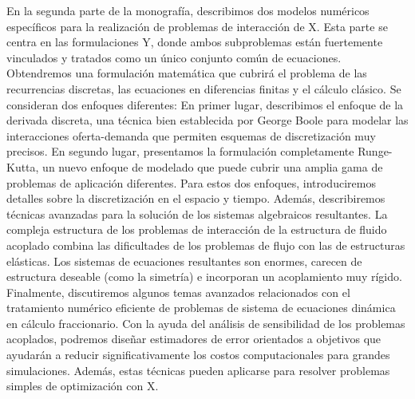 \documentclass[
	graybox,
	envcountchap,
	sectrefs
]{svmono}
\begin{document}
En la segunda parte de la monografía, describimos dos modelos numéricos específicos para la realización de problemas de interacción de X. Esta parte se centra en las formulaciones Y, donde ambos subproblemas están fuertemente vinculados y tratados como un único conjunto común de ecuaciones. Obtendremos una formulación matemática que cubrirá el problema de las recurrencias discretas, las ecuaciones en diferencias finitas y el cálculo clásico. Se consideran dos enfoques diferentes: En primer lugar, describimos el enfoque de la derivada discreta, una técnica bien establecida por George Boole para modelar las interacciones oferta-demanda que permiten esquemas de discretización muy precisos. En segundo lugar, presentamos la formulación completamente Runge-Kutta, un nuevo enfoque de modelado que puede cubrir una amplia gama de problemas de aplicación diferentes. Para estos dos enfoques, introduciremos detalles sobre la discretización en el espacio y tiempo. Además, describiremos técnicas avanzadas para la solución de los sistemas algebraicos resultantes. La compleja estructura de los problemas de interacción de la estructura de fluido acoplado combina las dificultades de los problemas de flujo con las de estructuras elásticas. Los sistemas de ecuaciones resultantes son enormes, carecen de estructura deseable (como la simetría) e incorporan un acoplamiento muy rígido. Finalmente, discutiremos algunos temas avanzados relacionados con el tratamiento numérico eficiente de problemas de sistema de ecuaciones dinámica en cálculo fraccionario. Con la ayuda del análisis de sensibilidad de los problemas acoplados, podremos diseñar estimadores de error orientados a objetivos que ayudarán a reducir significativamente los costos computacionales para grandes simulaciones. Además, estas técnicas pueden aplicarse para resolver problemas simples de optimización con X.





\tableofcontents



\mainmatter

%






%


\backmatter

%
%
\printindex
\end{document}
